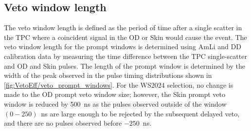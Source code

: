 \subsection{Veto window length}\label{sec:VetoEff/VetoWindowLength}
The veto window length is defined as the period of time after a single scatter in the TPC where a coincident signal in the OD or Skin would cause the event.
The veto window length for the prompt windows is determined using AmLi and DD calibration data by measuring the time difference between the TPC single-scatter and OD and Skin pulses. The length of the prompt window is determined by the width of the peak observed in the pulse timing distributions shown in \autoref{fig:VetoEff/veto_prompt_windows}. For the WS2024 selection, no change is made to the OD prompt veto window size; however, the Skin prompt veto window is reduced by 500~ns as the pulses observed outside of the window $(0-250)$~ns are large enough to be rejected by the subsequent delayed veto, and there are no pulses observed before $-250$~ns.
